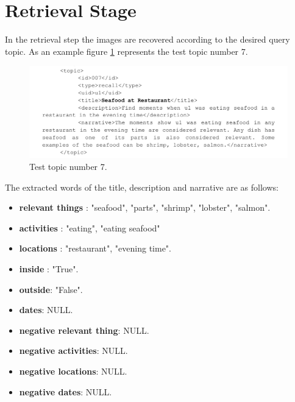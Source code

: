 \newpage
\section{Retrieval Stage}

    In the retrieval step the images are recovered according to the desired query topic.
    As an example figure \ref{fig:testtopic} represents the test topic number 7.
   
    \begin{figure}[H]
        \centering
        \captionsetup{justification=centering}
        \includegraphics[width = \textwidth]{Sections/6textprocessing/images/topic.png}
        \caption{Test topic number 7.}
        \label{fig:testtopic}
      \end{figure}
      
      The extracted words of the title, description and narrative are as follows:

      \begin{itemize}
        \itemsep0em
        \item \textbf{relevant things} : 
            "seafood",
            "parts",
            "shrimp",
            "lobster",
            "salmon".
        \item \textbf{activities} : "eating",
        "eating seafood"
        \item \textbf{locations} : "restaurant",  "evening time".
        \item \textbf{inside} : "True".
        \item \textbf{outside}: "False".
        \item \textbf{dates}: NULL.
        \item \textbf{negative relevant thing}: NULL.
        \item \textbf{negative activities}: NULL.
        \item \textbf{negative locations}:  NULL.
        \item \textbf{negative dates}: NULL.
       
    \end{itemize}

